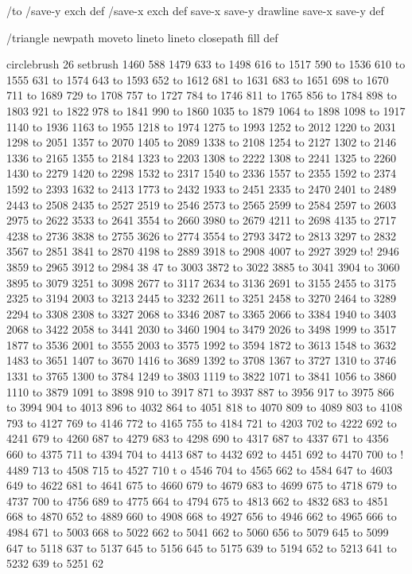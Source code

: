 /to
 { /save-y exch def
   /save-x exch def
   save-x save-y drawline
   save-x save-y } def

/triangle
 { newpath moveto lineto lineto closepath fill } def

circlebrush 26 setbrush
1460 588 1479 633 to 1498 616 to 1517 590 to 1536 610 to 1555 631 to 1574 643 to 1593 652 to 1612 681 to 1631 683 to 1651 698 to 1670 711 to 1689 729 to 1708 757 to 1727 784 to 1746 811 to 1765 856 to 1784 898 to 1803 921 to 1822 978 to 1841 990 to 1860 1035 to 1879 1064 to 1898 1098 to 1917 1140 to 1936 1163 to 1955 1218 to 1974 1275 to 1993 1252 to 2012 1220 to 2031 1298 to 2051 1357 to 2070 1405 to 2089 1338 to 2108 1254 to 2127 1302 to 2146 1336 to 2165 1355 to 2184 1323 to 2203 1308 to 2222 1308 to 2241 1325 to 2260 1430 to 2279 1420 to 2298 1532 to 2317 1540 to 2336 1557 to 2355 1592 to 2374 1592 to 2393 1632 to 2413 1773 to 2432 1933 to 2451 2335 to 2470 2401 to 2489 2443 to 2508 2435 to 2527 2519 to 2546 2573 to 2565 2599 to 2584 2597 to 2603 2975 to 2622 3533 to 2641 3554 to 2660 3980 to 2679 4211 to 2698 4135 to 2717 4238 to 2736 3838 to 2755 3626 to 2774 3554 to 2793 3472 to 2813 3297 to 2832 3567 to 2851 3841 to 2870 4198 to 2889 3918 to 2908 4007 to 2927 3929 to!
 2946 3859 to 2965 3912 to 2984 38
47 to 3003 3872 to 3022 3885 to 3041 3904 to 3060 3895 to 3079 3251 to 3098 2677 to 3117 2634 to 3136 2691 to 3155 2455 to 3175 2325 to 3194 2003 to 3213 2445 to 3232 2611 to 3251 2458 to 3270 2464 to 3289 2294 to 3308 2308 to 3327 2068 to 3346 2087 to 3365 2066 to 3384 1940 to 3403 2068 to 3422 2058 to 3441 2030 to 3460 1904 to 3479 2026 to 3498 1999 to 3517 1877 to 3536 2001 to 3555 2003 to 3575 1992 to 3594 1872 to 3613 1548 to 3632 1483 to 3651 1407 to 3670 1416 to 3689 1392 to 3708 1367 to 3727 1310 to 3746 1331 to 3765 1300 to 3784 1249 to 3803 1119 to 3822 1071 to 3841 1056 to 3860 1110 to 3879 1091 to 3898 910 to 3917 871 to 3937 887 to 3956 917 to 3975 866 to 3994 904 to 4013 896 to 4032 864 to 4051 818 to 4070 809 to 4089 803 to 4108 793 to 4127 769 to 4146 772 to 4165 755 to 4184 721 to 4203 702 to 4222 692 to 4241 679 to 4260 687 to 4279 683 to 4298 690 to 4317 687 to 4337 671 to 4356 660 to 4375 711 to 4394 704 to 4413 687 to 4432 692 to 4451 692 to 4470 700 to !
4489 713 to 4508 715 to 4527 710 t
o 4546 704 to 4565 662 to 4584 647 to 4603 649 to 4622 681 to 4641 675 to 4660 679 to 4679 683 to 4699 675 to 4718 679 to 4737 700 to 4756 689 to 4775 664 to 4794 675 to 4813 662 to 4832 683 to 4851 668 to 4870 652 to 4889 660 to 4908 668 to 4927 656 to 4946 662 to 4965 666 to 4984 671 to 5003 668 to 5022 662 to 5041 662 to 5060 656 to 5079 645 to 5099 647 to 5118 637 to 5137 645 to 5156 645 to 5175 639 to 5194 652 to 5213 641 to 5232 639 to 5251 62
